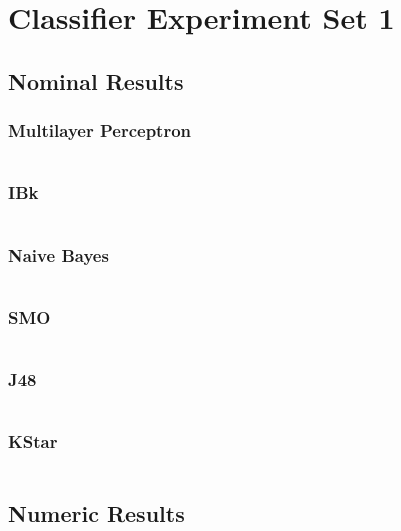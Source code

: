 \section{Classifier Experiment Set 1}
\label{sec:results:cexp1}
\subsection{Nominal Results}
\subsubsection{Multilayer Perceptron}
\inputminted[fontsize=\footnotesize,breaklines=true]{text}{../data/processed/third/nominal-multilayer-perceptron.txt}
\clearpage

\subsubsection{IBk}
\inputminted[fontsize=\footnotesize,breaklines=true]{text}{../data/processed/third/nominal-ibk-1.txt}
\clearpage

\subsubsection{Naive Bayes}
\inputminted[fontsize=\footnotesize,breaklines=true]{text}{../data/processed/third/nominal-naive-bayes.txt}
\clearpage

\subsubsection{SMO}
\inputminted[fontsize=\footnotesize,breaklines=true]{text}{../data/processed/third/nominal-smo.txt}
\clearpage

\subsubsection{J48}
\inputminted[fontsize=\footnotesize,breaklines=true]{text}{../data/processed/third/nominal-j48.txt}
\clearpage

\subsubsection{KStar}
\inputminted[fontsize=\footnotesize,breaklines=true]{text}{../data/processed/third/nominal-kstar.txt}
\clearpage

\subsection{Numeric Results}
